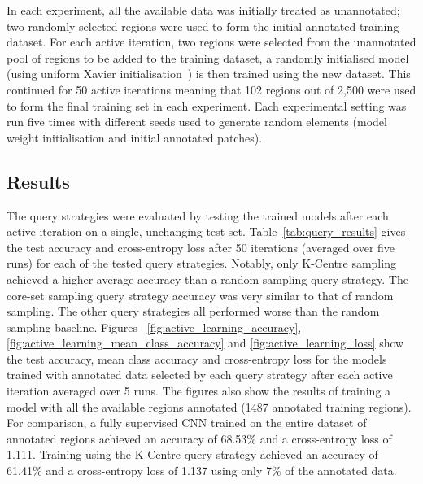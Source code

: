 In each experiment, all the available data was initially treated as unannotated; two randomly selected regions were used to form the initial annotated training dataset. For each active iteration, two regions were selected from the unannotated pool of regions to be added to the training dataset, a randomly initialised model (using uniform Xavier initialisation~\citep{glorot2010understanding}) is then trained using the new dataset. This continued for 50 active iterations meaning that 102 regions out of 2,500 were used to form the final training set in each experiment. Each experimental setting was run five times with different seeds used to generate random elements (model weight initialisation and initial annotated patches).

\subsection{Results}
The query strategies were evaluated by testing the trained models after each active iteration on a single, unchanging test set. Table~\ref{tab:query_results} gives the test accuracy and cross-entropy loss after 50 iterations (averaged over five runs) for each of the tested query strategies. Notably, only K-Centre sampling achieved a higher average accuracy than a random sampling query strategy. The core-set sampling query strategy accuracy was very similar to that of random sampling. The other query strategies all performed worse than the random sampling baseline. Figures ~\ref{fig:active_learning_accuracy}, \ref{fig:active_learning_mean_class_accuracy} and \ref{fig:active_learning_loss} show the test accuracy, mean class accuracy and cross-entropy loss for the models trained with annotated data selected by each query strategy after each active iteration averaged over 5 runs. The figures also show the results of training a model with all the available regions annotated (1487 annotated training regions). For comparison, a fully supervised CNN trained on the entire dataset of annotated regions achieved an accuracy of 68.53\% and a cross-entropy loss of 1.111. Training using the K-Centre query strategy achieved an accuracy of 61.41\% and a cross-entropy loss of 1.137 using only 7\% of the annotated data.

